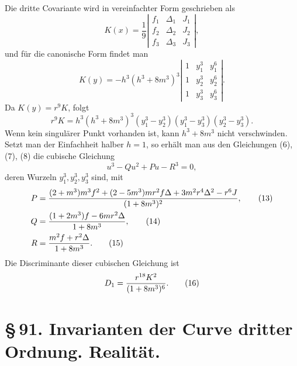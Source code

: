 \documentclass[11pt]{article}
\begin{document}
Die dritte Covariante wird in vereinfachter Form geschrieben als
\begin{equation}
 K(x)=\frac1{9}
 \left|\begin{array}{ccc}
 f_1&\Delta_1&J_1\\
 f_2&\Delta_2&J_2\\
 f_3&\Delta_3&J_3
 \end{array}\right|,
 \tag{9}
\end{equation}
und für die canonische Form findet man
\begin{equation}
 K(y)=-h^3(h^3+8m^3)^3
 \left|\begin{array}{ccc}
 1&y_1^3&y_1^6\\
 1&y_2^3&y_2^6\\
 1&y_3^3&y_3^6
 \end{array}\right|.
 \tag{10}
\end{equation}
Da $K(y)=r^9K$, folgt
\begin{equation}
 r^9K=h^3(h^3+8m^3)^3(y_1^3-y_2^3)(y_1^3-y_3^3)(y_2^3-y_3^3).
 \tag{11}
\end{equation}
Wenn kein singulärer Punkt vorhanden ist, kann $h^3+8m^3$ nicht verschwinden. Setzt man der Einfachheit halber $h=1$, so erhält man aus den Gleichungen (6), (7), (8) die cubische Gleichung
\begin{equation}
 u^3-Qu^2+Pu-R^3=0,
 \tag{12}
\end{equation}
deren Wurzeln $y_1^3,y_2^3,y_3^3$ sind, mit
\begin{align}
 P&={ (2+m^3)m^3f^2+(2-5m^3)mr^2f\Delta+3m^2r^4\Delta^2-r^6J\over (1+8m^3)^2},
 \tag{13}\\
 Q&={ (1+2m^3)f-6mr^2\Delta\over 1+8m^3},
 \tag{14}\\
 R&={m^2f+r^2\Delta\over 1+8m^3}.
 \tag{15}
\end{align}
Die Discriminante dieser cubischen Gleichung ist
\begin{equation}
 D_1={r^{18}K^2\over(1+8m^3)^6}.
 \tag{16}
\end{equation}

\section*{\S\,91. Invarianten der Curve dritter Ordnung. Realität.}
\end{document}
